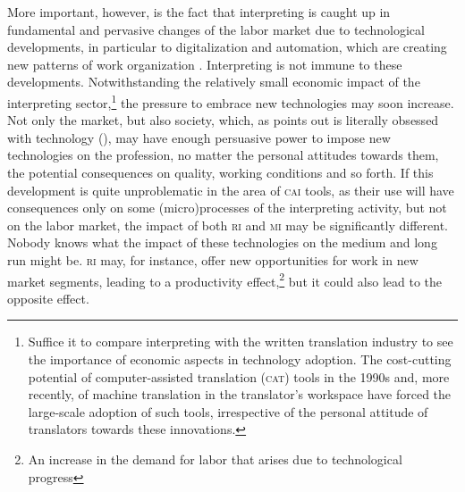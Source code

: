 \documentclass[output=paper]{langsci/langscibook}
\begin{document}
More important, however, is the fact that interpreting is caught up in fundamental and pervasive changes of the labor market due to technological developments, in particular to digitalization and automation, which are creating new patterns of work organization \citep{ursula_huws_logged_2016,neufeind_work_2018}. Interpreting is not immune to these developments. Notwithstanding the relatively small economic impact of the interpreting sector,\footnote{Suffice it to compare interpreting with the written translation industry to see the importance of economic aspects in technology adoption. The cost-cutting potential of computer-assisted translation (\textsc{cat}) tools in the 1990s and, more recently, of machine translation in the translator’s workspace have forced the large-scale adoption of such tools, irrespective of the personal attitude of translators towards these innovations.} the pressure to embrace new technologies may soon increase. Not only the market, but also society, which, as \citeauthor{besnier_homme_2012} points out is literally obsessed with technology (\citeyear{besnier_homme_2012}), may have enough persuasive power to impose new technologies on the profession, no matter the personal attitudes towards them, the potential consequences on quality, working conditions and so forth. If this development is quite unproblematic in the area of \textsc{cai} tools, as their use will have consequences only on some (micro)processes of the interpreting activity, but not on the labor market, the impact of both \textsc{ri} and \textsc{mi} may be significantly different. Nobody knows what the impact of these technologies on the medium and long run might be. \textsc{ri} may, for instance, offer new opportunities for work in new market segments, leading to a productivity effect,\footnote{An increase in the demand for labor that arises due to technological progress} but it could also lead to the opposite effect. 
\end{document}
